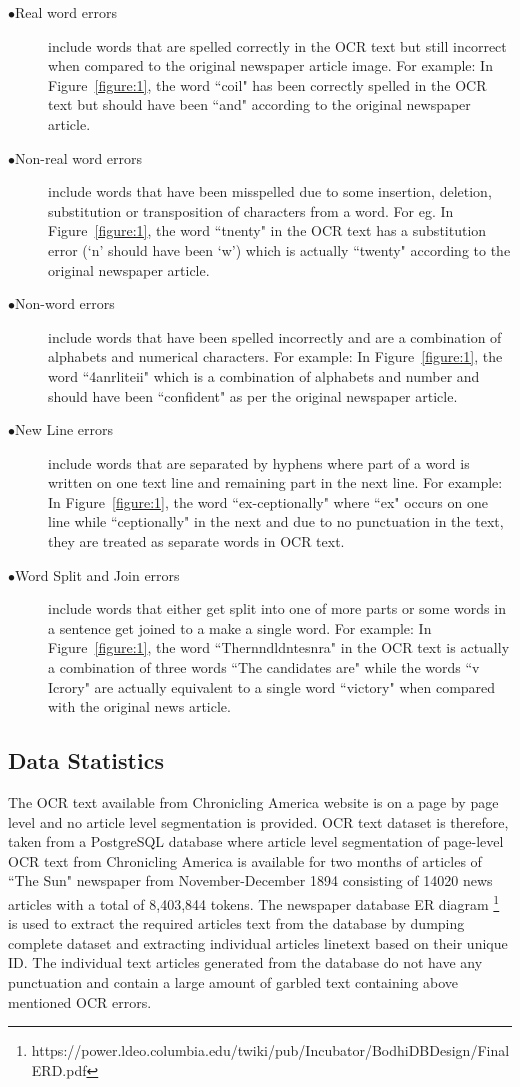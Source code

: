 \documentclass[12pt]{article}
\begin{document}
\begin{description}
 \item[$\bullet$Real word errors] include words that are spelled correctly in the OCR text but still incorrect when compared to the original newspaper article image. For example: In Figure~\ref{figure:1}, the word ``coil"  has been correctly spelled in the OCR text  but should have been ``and" according to the original newspaper article. 
 \item[$\bullet$Non-real word errors] include words that have been misspelled due to some insertion, deletion, substitution or transposition of characters from a word. For eg. In Figure~\ref{figure:1}, the word ``tnenty" in the OCR text has a substitution error (`n' should have been `w') which is actually ``twenty" according to the original newspaper article.
 \item[$\bullet$Non-word errors] include words that have been spelled incorrectly and are a combination of alphabets and numerical characters. For example: In Figure~\ref{figure:1}, the word ``4anrliteii" which is a combination of alphabets and number and should have been ``confident" as per the original newspaper article.
\item[$\bullet$New Line errors] include words that are separated by hyphens where part of a word is written on one text line and remaining part in the next line. For example: In Figure~\ref{figure:1}, the word ``ex-ceptionally" where ``ex" occurs on one line while ``ceptionally" in the next and due to no punctuation in the text, they are treated as separate words in OCR text.
\item[$\bullet$Word Split and Join errors] include words that either get split into one of more parts or some words in a sentence get joined to a make a single word. For example: In Figure~\ref{figure:1}, the word ``Thernndldntesnra" in the OCR text is actually a combination of three words ``The candidates are" while the words ``v Icrory" are actually equivalent to a single word ``victory" when compared with the original news article.
\end{description} 

\subsection{Data Statistics}
The OCR text available from Chronicling America website is on a page by page level and no article level segmentation is provided. OCR text dataset is therefore, taken from a PostgreSQL database where article level segmentation of page-level OCR text from Chronicling America is available for two months of articles of ``The Sun" newspaper from November-December 1894 consisting of 14020 news articles with a total of 8,403,844 tokens. The newspaper database ER diagram \footnote{https://power.ldeo.columbia.edu/twiki/pub/Incubator/BodhiDBDesign/Final ERD.pdf }
is used to extract the required articles text from the database by dumping complete dataset and extracting individual articles linetext based on their unique ID. The individual text articles generated from the database do not have any punctuation and contain a large amount of garbled text containing above mentioned OCR errors.
\end{document}
